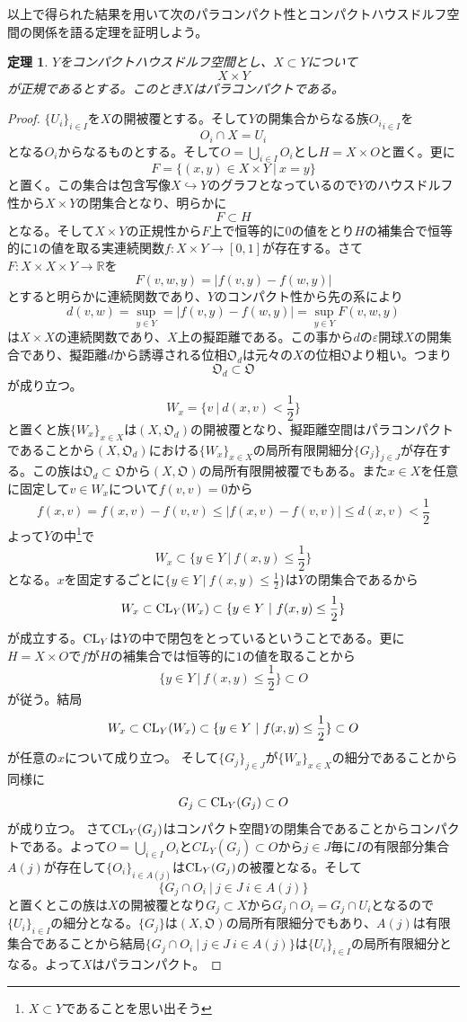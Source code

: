 \documentclass[leqno]{jsarticle}
\newtheorem{thm}{定理}
\newcommand{\rr}{\mathbb{R}}
\newcommand{\ep}{\varepsilon}
\newcommand{\cl}{\text{{\rm CL}}}
\begin{document}
以上で得られた結果を用いて次のパラコンパクト性とコンパクトハウスドルフ空間の関係を語る定理を証明しよう。
\setcounter{equation}{0}
\begin{thm}\label{suge}
$Y$をコンパクトハウスドルフ空間とし、$X\subset Y$について
\[
X\times Y
\]が正規であるとする。このとき$X$はパラコンパクトである。
\end{thm}
\begin{proof}
$\{U_i\}_{i\in I}$を$X$の開被覆とする。そして$Y$の開集合からなる族${O_i}_{i\in I}$を
\[
O_i\cap X=U_i
\]
となる$O_i$からなるものとする。そして$O=\bigcup_{i\in I}O_i$とし$H=X\times O$と置く。更に
\[
F=\{(x,y)\in X\times Y\ |\ x=y\}
\]
と置く。この集合は包含写像$X\hookrightarrow Y$のグラフとなっているので$Y$のハウスドルフ性から$X\times Y$の閉集合となり、明らかに
\[
F\subset H
\]
となる。そして$X\times Y$の正規性から$F$上で恒等的に$0$の値をとり$H$の補集合で恒等的に$1$の値を取る実連続関数$f:X\times Y\to [0,1]$が存在する。さて$F:X\times X\times Y\to \rr$を
\[
F(v,w,y)=|f(v,y)-f(w,y)|
\]
とすると明らかに連続関数であり、$Y$のコンパクト性から先の系により
\[
d(v,w)=\sup_{y\in Y}=|f(v,y)-f(w,y)|=\sup_{y\in Y}F(v,w,y)
\]
は$X\times X$の連続関数であり、$X$上の擬距離である。この事から$d$の$\ep$開球$X$の開集合であり、擬距離$d$から誘導される位相$\mathfrak{O}_d$は元々の$X$の位相$\mathfrak{O}$より粗い。つまり
\[
\mathfrak{O}_d\subset \mathfrak{O}
\]
が成り立つ。
\[
W_x=\{v\ |\ d(x,v)<\frac{1}{2}\}
\]
と置くと族$\{W_x\}_{x\in X}$は$(X,\mathfrak{O}_d)$の開被覆となり、擬距離空間はパラコンパクトであることから$(X,\mathfrak{O}_d)$における$\{W_x\}_{x\in X}$の局所有限開細分$\{G_j\}_{j\in J}$が存在する。この族は$\mathfrak{O}_d\subset \mathfrak{O}$から$(X,\mathfrak{O})$の局所有限開被覆でもある。また$x\in X$を任意に固定して$v\in W_x$について$f(v,v)=0$から
\[
f(x,v)=f(x,v)-f(v,v)\le |f(x,v)-f(v,v)|\le d(x,v)<\frac{1}{2}
\]よって$Y$の中\footnote{$X\subset Y$であることを思い出そう}で
\[
W_x\subset\{y\in Y\ |\ f(x,y)\le \frac{1}{2}\}
\]
となる。$x$を固定するごとに$\{y\in Y\ |\ f(x,y)\le \frac{1}{2}\}$は$Y$の閉集合であるから
\[
W_x\subset \cl_Y(W_x)\subset\{y\in Y\ |\ f(x,y)\le \frac{1}{2}\}
\]
が成立する。$\cl_Y$は$Y$の中で閉包をとっているということである。更に$H=X\times O$で$f$が$H$の補集合では恒等的に$1$の値を取ることから
\[
\{y\in Y\ |\ f(x,y)\le \frac{1}{2}\}\subset O
\]
が従う。結局
\[
W_x\subset \cl_Y(W_x)\subset\{y\in Y\ |\ f(x,y)\le \frac{1}{2}\}\subset O
\]
が任意の$x$について成り立つ。
そして$\{G_j\}_{j\in J}$が$\{W_x\}_{x\in X}$の細分であることから同様に
\[
G_j\subset \cl_Y(G_j)\subset O
\]
が成り立つ。
さて$\cl_Y(G_j)$はコンパクト空間$Y$の閉集合であることからコンパクトである。よって$O=\bigcup_{i\in I}O_i$と$CL_Y(G_j)\subset O$から$j\in J$毎に$I$の有限部分集合$A(j)$が存在して$\{O_i\}_{i\in A(j)}$は$\cl_Y(G_j)$の被覆となる。そして
\[
\{G_j\cap O_i\ |\ j\in J\ i\in A(j)\}
\]
と置くとこの族は$X$の開被覆となり$G_j\subset X$から$G_j\cap O_i=G_j\cap U_i$となるので$\{U_i\}_{i\in I}$の細分となる。$\{G_j\}$は$(X,\mathfrak{O})$の局所有限細分でもあり、$A(j)$は有限集合であることから結局$\{G_j\cap O_i\ |\ j\in J\ i\in A(j)\}$は$\{U_i\}_{i\in I}$の局所有限細分となる。よって$X$はパラコンパクト。
\end{proof}
\end{document}
